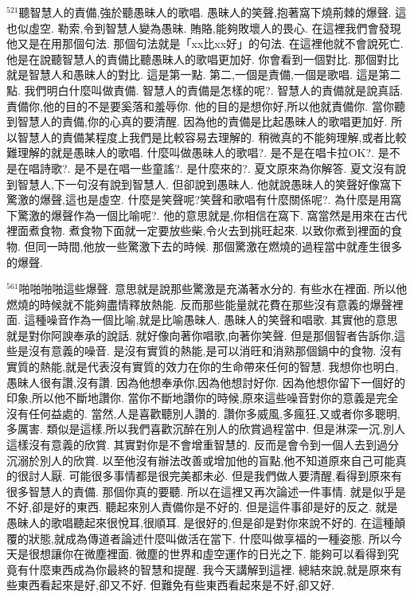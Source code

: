 \documentclass{book}
\begin{document}
$^{521}$聽智慧人的責備,強於聽愚昧人的歌唱.
愚昧人的笑聲,抱著窩下燒荊棘的爆聲.
這也似虛空.
勒索,令到智慧人變為愚昧.
賄賂,能夠敗壞人的畏心.
在這裡我們會發現他又是在用那個句法.
那個句法就是「xx比xx好」的句法.
在這裡他就不會說死亡.
他是在說聽智慧人的責備比聽愚昧人的歌唱更加好.
你會看到一個對比.
那個對比就是智慧人和愚昧人的對比.
這是第一點.
第二,一個是責備,一個是歌唱.
這是第二點.
我們明白什麼叫做責備.
智慧人的責備是怎樣的呢?.
智慧人的責備就是說真話.
責備你,他的目的不是要奚落和羞辱你.
他的目的是想你好,所以他就責備你.
當你聽到智慧人的責備,你的心真的要清醒.
因為他的責備是比起愚昧人的歌唱更加好.
所以智慧人的責備某程度上我們是比較容易去理解的.
稍微真的不能夠理解,或者比較難理解的就是愚昧人的歌唱.
什麼叫做愚昧人的歌唱?.
是不是在唱卡拉OK?.
是不是在唱詩歌?.
是不是在唱一些童謠?.
是什麼來的?.
夏文原來為你解答.
夏文沒有說到智慧人,下一句沒有說到智慧人.
但卻說到愚昧人.
他就說愚昧人的笑聲好像窩下驚激的爆聲,這也是虛空.
什麼是笑聲呢?笑聲和歌唱有什麼關係呢?.
為什麼是用窩下驚激的爆聲作為一個比喻呢?.
他的意思就是,你相信在窩下.
窩當然是用來在古代裡面煮食物.
煮食物下面就一定要放些柴,令火去到挑旺起來.
以致你煮到裡面的食物.
但同一時間,他放一些驚激下去的時候.
那個驚激在燃燒的過程當中就產生很多的爆聲.

$^{561}$啪啪啪啪這些爆聲.
意思就是說那些驚激是充滿著水分的.
有些水在裡面.
所以他燃燒的時候就不能夠盡情釋放熱能.
反而那些能量就花費在那些沒有意義的爆聲裡面.
這種噪音作為一個比喻,就是比喻愚昧人.
愚昧人的笑聲和唱歌.
其實他的意思就是對你阿諛奉承的說話.
就好像向著你唱歌,向著你笑聲.
但是那個智者告訴你,這些是沒有意義的噪音.
是沒有實質的熱能,是可以消旺和消熟那個鍋中的食物.
沒有實質的熱能,就是代表沒有實質的效力在你的生命帶來任何的智慧.
我想你也明白,愚昧人很有讚,沒有讚.
因為他想奉承你,因為他想討好你.
因為他想你留下一個好的印象,所以他不斷地讚你.
當你不斷地讚你的時候,原來這些噪音對你的意義是完全沒有任何益處的.
當然,人是喜歡聽別人讚的.
讚你多威風,多瘋狂,又或者你多聰明,多厲害.
類似是這樣,所以我們喜歡沉醉在別人的欣賞過程當中.
但是淋深一沉,別人這樣沒有意義的欣賞.
其實對你是不會增重智慧的.
反而是會令到一個人去到過分沉溺於別人的欣賞.
以至他沒有辦法改善或增加他的盲點,他不知道原來自己可能真的很討人厭.
可能很多事情都是很完美都未必.
但是我們做人要清醒,看得到原來有很多智慧人的責備.
那個你真的要聽.
所以在這裡又再次論述一件事情.
就是似乎是不好,卻是好的東西.
聽起來別人責備你是不好的.
但是這件事卻是好的反之.
就是愚昧人的歌唱聽起來很悅耳,很順耳.
是很好的,但是卻是對你來說不好的.
在這種顛覆的狀態,就成為傳道者論述什麼叫做活在當下.
什麼叫做享福的一種姿態.
所以今天是很想讓你在微塵裡面.
微塵的世界和虛空運作的日光之下.
能夠可以看得到究竟有什麼東西成為你最終的智慧和提醒.
我今天講解到這裡.
總結來說,就是原來有些東西看起來是好,卻又不好.
但難免有些東西看起來是不好,卻又好.
\end{document}
